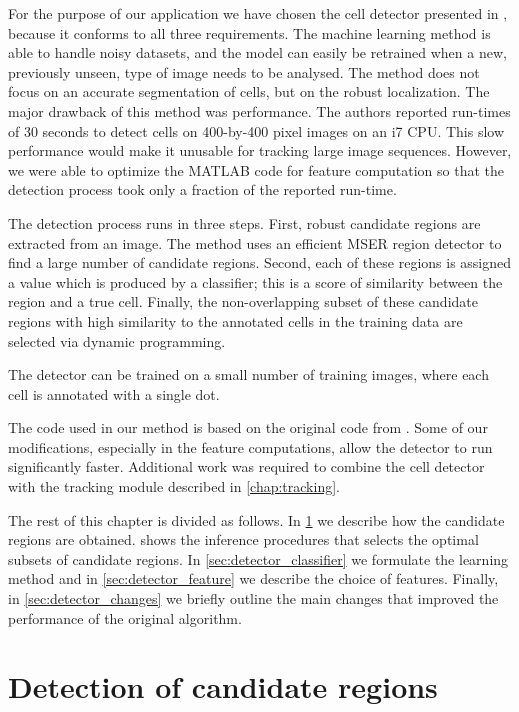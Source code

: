 	For the purpose of our application we have chosen the cell detector presented in \cite{arteta12}, because it conforms to all three requirements. The machine learning method is able to handle noisy datasets, and the model can easily be retrained when a new, previously unseen, type of image needs to be analysed. The method does not focus on an accurate segmentation of cells, but on the robust localization. The major drawback of this method was performance. The authors reported run-times of 30 seconds to detect cells on 400-by-400 pixel images on an i7 CPU. This slow performance would make it unusable for tracking large image sequences. However, we were able to optimize the MATLAB code for feature computation so that the detection process took only a fraction of the reported run-time.
	
	The detection process runs in three steps. First, robust candidate regions are extracted from an image. The method uses an efficient MSER region detector \cite{matas04} to find a large number of candidate regions. Second, each of these regions is assigned a value which is produced by a classifier; this is a score of similarity between the region and a true cell. Finally, the non-overlapping subset of these candidate regions with high similarity to the annotated cells in the training data are selected via dynamic programming.
	
	The detector can be trained on a small number of training images, where each cell is  annotated with a single dot. 

	The code used in our method is based on the original code from \cite{arteta12}. Some of our modifications, especially in the feature computations, allow the detector to run significantly faster. Additional work was required to combine the cell detector with the tracking module described in \cref{chap:tracking}.
	
	The rest of this chapter is divided as follows. In \cref{sec:detector_extremal} we describe how the candidate regions are obtained.  shows the inference procedures that selects the optimal subsets of candidate regions. In \cref{sec:detector_classifier} we formulate the learning method and in \cref{sec:detector_feature} we describe the choice of features. Finally, in \cref{sec:detector_changes} we briefly outline the main changes that improved the performance of the original algorithm.
	
	\section{Detection of candidate regions \statusfirstdraft}
	\label{sec:detector_extremal}
	
